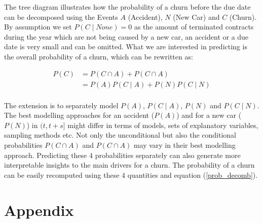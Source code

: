 \documentclass[12pt,titlepage]{article}
\begin{document}
\noindent
The tree diagram illustrates how the probability of a churn before the due date can be decomposed using the Events $A$ (Accident), $N$ (New Car) and $C$ (Churn). By assumption we set $P(C\mid None) = 0$ as the amount of terminated contracts during the year which are not being caused by a new car, an accident or a due date is very small and can be omitted. What we are interested in predicting is the overall probability of a churn, which can be rewritten as:
\noindent
\begin{center}
\begin{equation} \label{prob_decomb}
    \begin{aligned}
        P(C) & = P(C\cap A) + P(C\cap A) \\
        & = P(A)P(C\mid A) + P(N)P(C\mid N) \\
    \end{aligned}
\end{equation}
\end{center}
\vspace{1mm}

\noindent
The extension is to separately model $P(A)$, $P(C\mid A)$, $P(N)$ and $P(C\mid N)$. The best modelling approaches for an accident ($P(A)$) and for a new car ($P(N)$) in $(t, t+s]$ might differ in terms of models, sets of explanatory variables, sampling methods etc. Not only the unconditional but also the conditional probabilities $P(C\cap A)$ and $P(C\cap A)$ may vary in their best modelling approach. Predicting these 4 probabilities separately can also generate more interpretable insights to the main drivers for a churn. The probability of a churn can be easily recomputed using these 4 quantities and equation (\ref{prob_decomb}). \\

\newpage

\thispagestyle{empty}

\printbibliography

\vspace*{6mm}

\newpage

\thispagestyle{empty}

\section*{Appendix} \par
\end{document}
